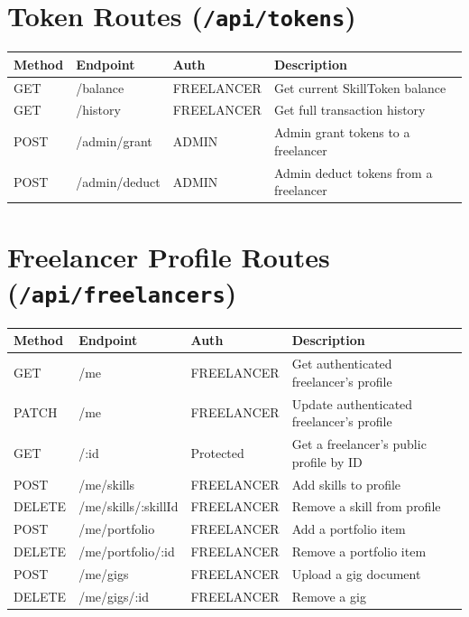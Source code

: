 \section{Token Routes (\texttt{/api/tokens})}

\begin{longtable}{|p{2.5cm}|p{4.5cm}|p{2cm}|p{5cm}|}
\hline
\textbf{Method} & \textbf{Endpoint} & \textbf{Auth} & \textbf{Description} \\ \hline
\endhead
GET & /balance & FREELANCER & Get current SkillToken balance \\ \hline
GET & /history & FREELANCER & Get full transaction history \\ \hline
POST & /admin/grant & ADMIN & Admin grant tokens to a freelancer \\ \hline
POST & /admin/deduct & ADMIN & Admin deduct tokens from a freelancer \\ \hline
\end{longtable}

\section{Freelancer Profile Routes (\texttt{/api/freelancers})}

\begin{longtable}{|p{2.5cm}|p{4.5cm}|p{2cm}|p{5cm}|}
\hline
\textbf{Method} & \textbf{Endpoint} & \textbf{Auth} & \textbf{Description} \\ \hline
\endhead
GET & /me & FREELANCER & Get authenticated freelancer's profile \\ \hline
PATCH & /me & FREELANCER & Update authenticated freelancer's profile \\ \hline
GET & /:id & Protected & Get a freelancer's public profile by ID \\ \hline
POST & /me/skills & FREELANCER & Add skills to profile \\ \hline
DELETE & /me/skills/:skillId & FREELANCER & Remove a skill from profile \\ \hline
POST & /me/portfolio & FREELANCER & Add a portfolio item \\ \hline
DELETE & /me/portfolio/:id & FREELANCER & Remove a portfolio item \\ \hline
POST & /me/gigs & FREELANCER & Upload a gig document \\ \hline
DELETE & /me/gigs/:id & FREELANCER & Remove a gig \\ \hline
\end{longtable}

